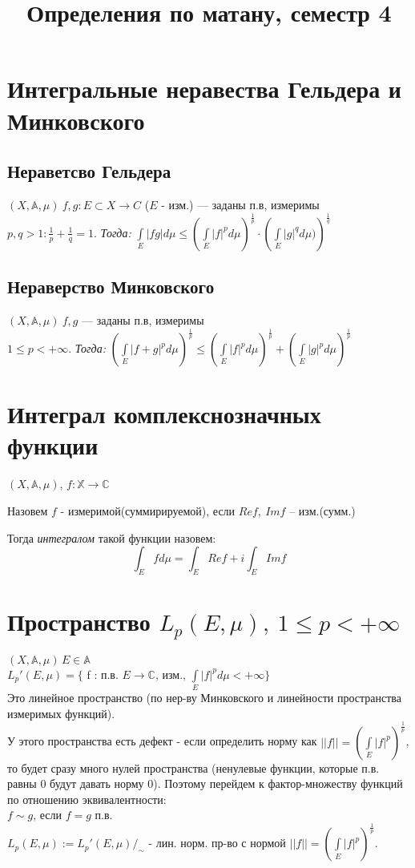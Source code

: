 \documentclass[paper=a4, fontsize=17pt]{article}
\title{Определения по матану, семестр 4}
\begin{document}
	\maketitle
	\tableofcontents
	\newpage
	
	\section{Интегральные неравества Гельдера и Минковского}
	\subsection{Нераветсво Гельдера}
	$(X, \mathds{A}, \mu)\ f, g : E \subset X \rightarrow C$ ($E$ - изм.) --- заданы п.в, измеримы\\
	$p, q > 1 : \frac{1}{p} + \frac{1}{q} = 1$. 
	\emph{Тогда:}
	${\displaystyle \int\limits_E |fg|d\mu \leq \left(\int\limits_E |f|^p d\mu\right)^\frac{1}{p} \cdot \left(\int\limits_E |g|^q d\mu)\right)^\frac{1}{q}}$
	\subsection{Нераверство Минковского}
	$(X, \mathds{A}, \mu)\ f, g $ --- заданы п.в, измеримы\\
	$1 \leq p < +\infty$. 
	\emph{Тогда:}
	${\displaystyle \left(\int\limits_E |f + g|^p d\mu \right)^\frac{1}{p} 
		\leq \left(\int\limits_E |f|^p d\mu\right)^\frac{1}{p} 
		+ \left(\int\limits_E |g|^p d\mu\right)^\frac{1}{p}}$
	
	\section{Интеграл комплекснозначных функции}
	$ (X, \mathbb{A}, \mu) $, $ f : \mathbb{X} \rightarrow \mathbb{C} $
	
	Назовем $ f $ - измеримой(суммирируемой), если $ Re f, ~ Im f $ -- изм.(сумм.)
	
	Тогда \emph{интегралом} такой функции назовем:
	$$ \int_E f d\mu = \int_E Re f + i\int_E Im f $$
	
	\section{Пространство $L_p(E,\mu),\ 1 \leq p < +\infty$}
	$(X, \mathds{A}, \mu)\, E \in \mathds{A}$\\
	$L_p'(E, \mu) = \{$ f : п.в. $E \rightarrow \mathbb{C}$, изм., $ \int\limits_E |f|^p d\mu < +\infty \}$\\
	Это линейное пространство (по нер-ву Минковского и линейности пространства измеримых функций).\\
	У этого пространства есть дефект - если определить норму как $||f|| = \left(\int\limits_E |f|^p\right)^\frac{1}{p}$, то будет сразу много нулей пространства (ненулевые функции, которые п.в. равны 0 будут давать норму 0).
	Поэтому перейдем к фактор-множеству функций по отношению эквивалентности:\\
	$f \sim g$, если $f = g$ п.в.\\
	$ L_p(E, \mu) := L_p'(E, \mu) /_{\sim}$ - лин. норм. пр-во с нормой $||f|| = \left(\int\limits_E |f|^p\right)^\frac{1}{p}$.\\
	
\end{document}
